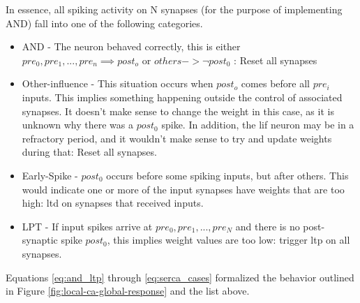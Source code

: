 


In essence, all spiking activity on N synapses (for the purpose of implementing
AND) fall into one of the following categories.
\begin{itemize}
\item AND - The neuron behaved correctly, this is either $pre_0, pre_1, ...,
  pre_n \implies post_o$ or $others -> \neg post_0$ : Reset all synapses
\item Other-influence - This situation occurs when $post_o$ comes before all
  $pre_i$ inputs. This implies something happening outside the control of
  associated synapses. It doesn't make sense to change the weight in this case,
  as it is unknown why there was a $post_0$ spike. In addition, the \Gls{lif} neuron
  may be in a refractory period, and it wouldn't make sense to try and update
  weights during that: Reset all synapses.
\item Early-Spike - $post_0$ occurs before some spiking inputs, but after
  others. This would indicate one or more of the input synapses have weights
  that are too high: \Gls{ltd} on synapses that received inputs.
\item LPT - If input spikes arrive at $pre_0, pre_1, ..., pre_N$ and there is no
  post-synaptic spike $post_0$, this implies weight values are too low: trigger
  \Gls{ltp} on all synapses.
\end{itemize}

Equations \ref{eq:and_ltp} through \ref{eq:serca_cases} formalized the behavior outlined
in Figure \ref{fig:local-ca-global-response} and the list above.

